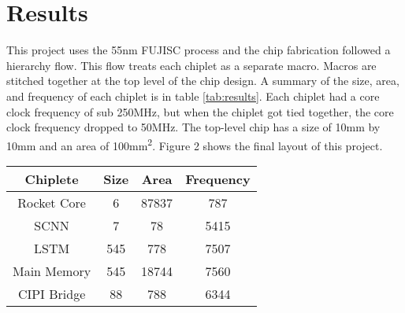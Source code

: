 \documentclass[../main.tex]{subfiles}
\begin{document}
\section{Results}
This project uses the 55nm FUJISC process and the chip fabrication followed a hierarchy flow. This flow treats each chiplet as a separate macro. Macros are stitched together at the top level of the chip design. A summary of the size, area, and frequency of each chiplet is in table \ref{tab:results}. Each chiplet had a core clock frequency of sub 250MHz, but when the chiplet got tied together, the core clock frequency dropped to 50MHz. The top-level chip has a size of 10mm by 10mm and an area of 100mm\textsuperscript{2}. Figure 2 shows the final layout of this project.

\begin{center}
\begin{tabular}{||c c c c||}
 \hline
 Chiplete & Size & Area & Frequency \\ [0.5ex] 
 \hline\hline
 Rocket Core & 6 & 87837 & 787 \\ 
 \hline
 SCNN & 7 & 78 & 5415 \\
 \hline
 LSTM & 545 & 778 & 7507 \\
 \hline
 Main Memory & 545 & 18744 & 7560 \\
 \hline
 CIPI Bridge & 88 & 788 & 6344 \\ [1ex] 
 \hline
\end{tabular}
\label{tab:results}
\end{center}
\end{document}

